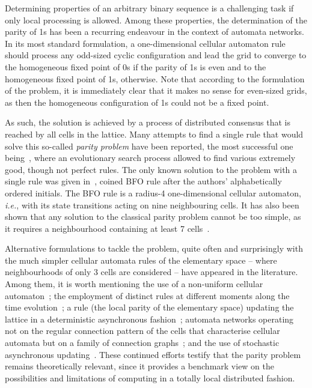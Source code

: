 \documentclass{sn-jnl}
\begin{document}
Determining properties of an arbitrary binary sequence is a challenging task if only local processing is allowed. Among these properties, the determination of the parity of 1s has been a recurring endeavour in the context of automata networks. In its most standard formulation, a one-dimensional cellular automaton rule should process any odd-sized cyclic configuration and lead the grid to converge to the homogeneous fixed point of 0s if the parity of 1s is even and to the homogeneous fixed point of 1s, otherwise.
Note that according to the formulation of the problem, it is immediately clear that it makes no sense for even-sized grids, as then the homogeneous configuration of 1s could not be a fixed point.

As such, the solution is achieved by a process of distributed consensus that is reached by all cells in the lattice.   
Many attempts to find a single rule that would solve this so-called \emph{parity problem} have been reported, the most successful one being~\cite{Wolz_Balbi_2008}, where an evolutionary search process allowed to find various extremely good, though not perfect rules. The only known solution to the problem with a single rule was given in~\cite{BFO2013}, coined BFO rule after the authors' alphabetically ordered initials. The BFO rule is a radius-4 one-dimensional cellular automaton, \emph{i.e.}, with its state transitions acting on nine neighbouring cells. It has also been shown that any solution to the classical parity problem cannot be too simple, as it requires a neighbourhood containing at least 7 cells~\cite{No6}.

Alternative formulations to tackle the problem, quite often and surprisingly with the much simpler cellular automata rules of the elementary space -- where neighbourhoods of only 3 cells are considered -- have appeared in the literature. Among them, it is worth mentioning the use of a non-uniform cellular automaton~\cite{Sipper_1998}; the employment of distinct rules at different moments along the time evolution~\cite{Lee_Chu_Xao_2001, Martin_Balbi_improvement_2009}; a rule (the local parity of the elementary space) updating the lattice in a deterministic asynchronous fashion~\cite{AsynchParityECA150_2019}; automata networks operating not on the regular connection pattern of the cells that characterise cellular automata but on a family of connection graphs~\cite{SynchParityECA150Graph_2022, GenSynchParityGraph_2024}; and the use of stochastic asynchronous updating~\cite{Fates_2024}. These   continued efforts testify that the parity problem remains theoretically relevant, since it provides a benchmark view on the possibilities and limitations of computing in a totally local distributed fashion.
\end{document}
